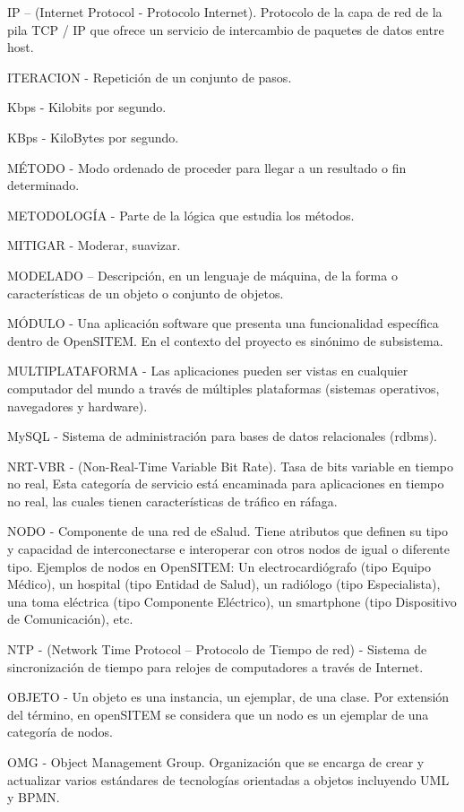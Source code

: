 IP – (Internet Protocol - Protocolo Internet). Protocolo de la capa de red de la pila TCP / IP que ofrece un servicio de intercambio de paquetes de datos entre host.

ITERACION - Repetición de un conjunto de pasos.

Kbps -  Kilobits por segundo.

KBps -  KiloBytes por segundo.


MÉTODO - Modo ordenado de proceder para llegar a un resultado o fin determinado. 

METODOLOGÍA - Parte de la lógica que estudia los métodos.

MITIGAR - Moderar, suavizar.

MODELADO – Descripción, en un lenguaje de máquina, de la forma o características de un objeto o conjunto de objetos.

MÓDULO - Una aplicación software que presenta una funcionalidad específica dentro de OpenSITEM. En el contexto del proyecto es sinónimo de subsistema.

MULTIPLATAFORMA -  Las aplicaciones pueden ser vistas en cualquier computador del mundo a través de múltiples plataformas (sistemas operativos, navegadores y hardware).

MySQL -  Sistema de administración para bases de datos relacionales (rdbms).

NRT-VBR - (Non-Real-Time Variable Bit Rate). Tasa de bits variable en tiempo no real, Esta categoría de servicio está encaminada para aplicaciones en tiempo no real, las cuales tienen características de tráfico en ráfaga.

NODO - Componente de una red de eSalud. Tiene atributos que definen su tipo y capacidad de interconectarse e interoperar con otros nodos de igual o diferente tipo. Ejemplos de nodos en OpenSITEM: Un electrocardiógrafo (tipo Equipo Médico), un hospital (tipo Entidad de Salud), un radiólogo (tipo Especialista), una toma eléctrica (tipo Componente Eléctrico), un smartphone (tipo Dispositivo de Comunicación), etc.

NTP - (Network Time Protocol – Protocolo de Tiempo de red) - Sistema de sincronización de tiempo para relojes de computadores a través de Internet.

OBJETO -  Un objeto es una instancia, un ejemplar, de una clase. Por extensión del término, en openSITEM se considera que un nodo es un ejemplar de una categoría de nodos.

OMG - Object Management Group. Organización que se encarga de crear y actualizar varios estándares de tecnologías orientadas a objetos incluyendo UML y BPMN.

